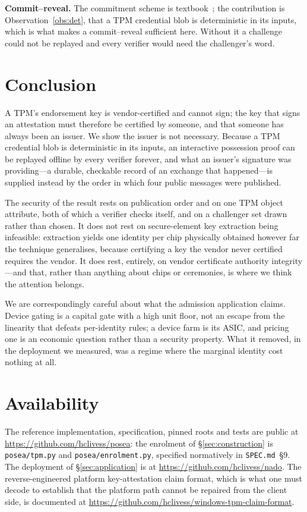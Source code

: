 \documentclass[conference,10pt]{IEEEtran}
\begin{document}
\textbf{Commit--reveal.} The commitment scheme is textbook~\cite{blum}; the contribution is
Observation~\ref{obs:det}, that a TPM credential blob is deterministic in its inputs, which is what makes
a commit--reveal sufficient here. Without it a challenge could not be replayed and every verifier would
need the challenger's word.

\section{Conclusion}

A TPM's endorsement key is vendor-certified and cannot sign; the key that signs an attestation must
therefore be certified by someone, and that someone has always been an issuer. We show the issuer is not
necessary. Because a TPM credential blob is deterministic in its inputs, an interactive possession proof
can be replayed offline by every verifier forever, and what an issuer's signature was providing---a
durable, checkable record of an exchange that happened---is supplied instead by the order in which four
public messages were published.

The security of the result rests on publication order and on one TPM object attribute, both of which a
verifier checks itself, and on a challenger set drawn rather than chosen. It does not rest on
secure-element key extraction being infeasible: extraction yields one identity per chip physically
obtained however far the technique generalises, because certifying a key the vendor never certified
requires the vendor. It does rest, entirely, on vendor certificate authority integrity---and that, rather
than anything about chips or ceremonies, is where we think the attention belongs.

We are correspondingly careful about what the admission application claims. Device gating is a capital
gate with a high unit floor, not an escape from the linearity that defeats per-identity rules; a device
farm is its ASIC, and pricing one is an economic question rather than a security property. What it
removed, in the deployment we measured, was a regime where the marginal identity cost nothing at all.

\section*{Availability}

The reference implementation, specification, pinned roots and tests are public at
\url{https://github.com/hclivess/posea}: the enrolment of \S\ref{sec:construction} is
\texttt{posea/tpm.py} and \texttt{posea/enrolment.py}, specified normatively in \texttt{SPEC.md}~\S9.
The deployment of \S\ref{sec:application} is at \url{https://github.com/hclivess/nado}. The
reverse-engineered platform key-attestation claim format, which is what one must decode to establish
that the platform path cannot be repaired from the client side, is documented at
\url{https://github.com/hclivess/windows-tpm-claim-format}.
\end{document}
